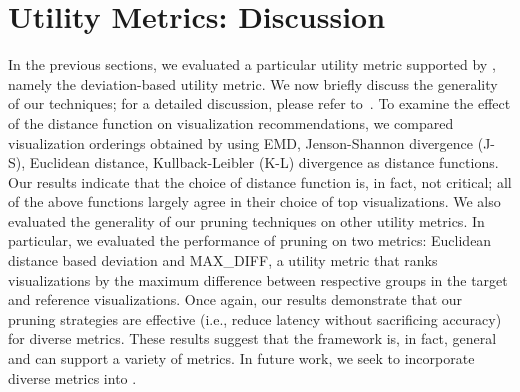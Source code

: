 
\section{Utility Metrics: Discussion}
\label{sec:discussion}
In the previous sections, we evaluated a particular utility metric supported by \SeeDB,
namely the deviation-based utility metric.
We now briefly discuss the generality of our techniques;
for a detailed discussion, please refer to~\cite{seedb-tr}.
To examine the effect of the distance function on visualization recommendations, we compared
visualization orderings obtained by using EMD, Jenson-Shannon divergence (J-S), Euclidean distance, 
Kullback-Leibler (K-L) divergence as distance functions.
Our results indicate that the choice of distance function is, in fact, not critical; 
all of the above functions largely agree in their choice of top visualizations.
We also evaluated the generality of our pruning techniques on other utility metrics.
In particular, we evaluated the performance of pruning on two metrics:
Euclidean distance based deviation and MAX\_DIFF, a utility metric that ranks visualizations
by the maximum difference between respective groups in the target and reference visualizations.
Once again, our results demonstrate that our pruning strategies are effective (i.e., reduce latency without sacrificing
accuracy) for diverse metrics.
These results suggest that the \SeeDB framework is, in fact, general and can support a variety of
metrics. 
In future work, we seek to incorporate diverse metrics into \SeeDB. 
\fi

